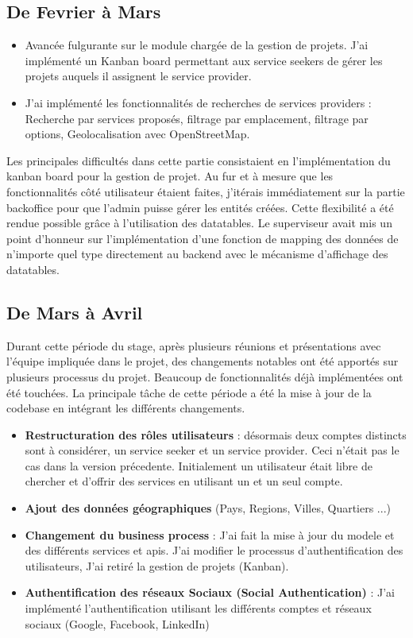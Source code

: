 {\subsection*{De Fevrier à Mars}

\begin{itemize} 
    \item Avancée fulgurante sur le module chargée de la gestion de projets. J'ai implémenté un Kanban board permettant aux service seekers de gérer les projets auquels il assignent le service provider.
    \item J'ai implémenté les fonctionnalités de recherches de services providers : Recherche par services proposés, filtrage par emplacement, filtrage par options, Geolocalisation avec OpenStreetMap.
\end{itemize}

\vspace{1cm}
Les principales difficultés dans cette partie consistaient en l'implémentation du kanban board pour la gestion de projet. Au fur et à mesure que les fonctionnalités côté utilisateur étaient faites, j'itérais immédiatement sur la partie backoffice pour que l'admin puisse gérer les entités créées. Cette flexibilité a été rendue possible grâce à l'utilisation des datatables. Le superviseur avait mis un point d'honneur sur l'implémentation d'une fonction de mapping des données de n'importe quel type directement au backend avec le mécanisme d'affichage des datatables.

\subsection*{De Mars à Avril}

Durant cette période du stage, après plusieurs réunions et présentations avec l'équipe impliquée dans le projet, des changements notables ont été apportés sur plusieurs processus du projet. Beaucoup de fonctionnalités déjà implémentées ont été touchées. La principale tâche de cette période a été la mise à jour de la codebase en intégrant les différents changements. \\

\begin{itemize}
    \item \textbf{Restructuration des rôles utilisateurs} : désormais deux comptes distincts sont à considérer, un service seeker et un service provider. Ceci n'était pas le cas dans la version précedente. Initialement un utilisateur était libre de chercher et d'offrir des services en utilisant un et un seul compte.
    \item \textbf{Ajout des données géographiques} (Pays, Regions, Villes, Quartiers ...)
    \item \textbf{Changement du business process} : 
    J'ai fait la mise à jour du modele et des différents services et apis. J'ai modifier le processus d'authentification des utilisateurs, J'ai retiré la gestion de projets (Kanban).
    \item \textbf{Authentification des réseaux Sociaux (Social Authentication)} : J'ai implémenté l'authentification utilisant les différents comptes et réseaux sociaux (Google, Facebook, LinkedIn)
\end{itemize}

}
